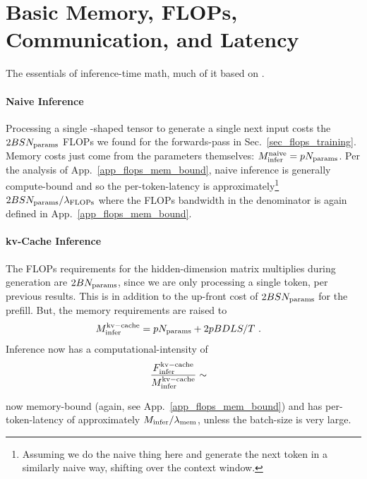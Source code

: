 \documentclass[11pt]{article}
\begin{document}
\section{Basic Memory, FLOPs, Communication, and Latency}

The essentials of inference-time math, much of it based on \cite{kipply_inference_math}.

\paragraph{Naive Inference} Processing a single -shaped tensor to generate a single
next input costs the $ 2BSN _{ {\rm params}  } $ FLOPs we found for the forwards-pass in
Sec.~\ref{sec_flops_training}. Memory costs just come from the parameters themselves: $ M _{ {\rm
infer}  }^{ {\rm naive}  }=pN _{ {\rm params}  } $. Per the analysis of App.~\ref{app_flops_mem_bound},
naive inference is generally compute-bound and so the per-token-latency is approximately\footnote{Assuming we
do the naive thing here and generate the next token in a similarly naive way, shifting over the
context window.}  $  2BSN _{ {\rm params}  }/ \lambda _{ {\rm FLOPs}  } $ where the FLOPs bandwidth
in the denominator is again defined in App.~\ref{app_flops_mem_bound}.

\paragraph{kv-Cache Inference}
The FLOPs requirements for the hidden-dimension matrix multiplies during generation are $2BN _{ {\rm params}  } $,
since we are only processing a single token, per previous results.   This is in addition to the up-front cost of $ 2BSN _{
{\rm params}} $ for the prefill. But, the memory requirements are raised to
\begin{align}
    M _{ {\rm infer}  }^{ {\rm kv-cache}  } &=pN _{ {\rm params}  } + 2pBDLS/T\ .
\end{align}
Inference now has a computational-intensity of
\begin{align}
    \frac{ F _{ {\rm infer} } ^{ {\rm kv-cache} } }{ M _{ {\rm infer}  }^{ {\rm kv-cache}  } } & \sim
\end{align}

now memory-bound (again, see App.~\ref{app_flops_mem_bound}) and has per-token-latency of
approximately $ M _{ {\rm infer} }/ \lambda _{ {\rm mem} }$, unless the batch-size is very large.
\end{document}
